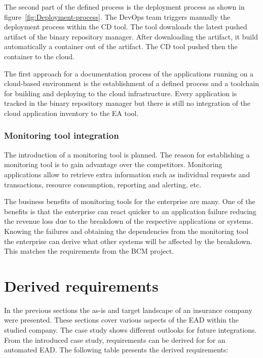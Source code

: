 The second part of the defined process is the deployment process as shown in figure~\ref{fig:Deployment-process}. The DevOps team triggers manually the deployment process within the CD tool. The tool downloads the latest pushed artifact of the binary repository manager. After downloading the artifact, it build automatically a container out of the artifact. The CD tool pushed then the container to the cloud.

The first approach for a documentation process of the applications running on a cloud-based environment is the establishment of a defined process and a toolchain for building and deploying to the cloud infrastructure. Every application is tracked in the binary repository manager but there is still no integration of the cloud application inventory to the EA tool.

\subsubsection{Monitoring tool integration}

The introduction of a monitoring tool is planned. The reason for establishing a monitoring tool is to gain advantage over the competitors. Monitoring applications allow to retrieve extra information such as individual requests and transactions, resource consumption, reporting and alerting, etc.

The business benefits of monitoring tools for the enterprise are many. One of the benefits is that the enterprise can react quicker to an application failure reducing the revenue loss due to the breakdown of the respective applications or systems. Knowing the failures and obtaining the dependencies from the monitoring tool the enterprise can derive what other systems will be affected by the breakdown. This matches the requirements from the BCM project.

\section{Derived requirements}\label{section:derivedrequirements}

In the previous sections the as-is and target landscape of an insurance company were presented. These sections cover various aspects of the EAD within the studied company. The case study shows different outlooks for future integrations. From the introduced case study, requirements can be derived for for an automated EAD. The following table presents the derived requirements:

